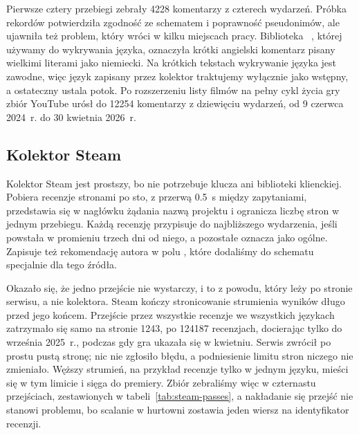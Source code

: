 Pierwsze cztery przebiegi zebrały \num{4228} komentarzy z czterech wydarzeń.
Próbka rekordów potwierdziła zgodność ze schematem i poprawność pseudonimów, ale ujawniła też problem, który wróci w kilku miejscach pracy.
Biblioteka ~\cite{langdetect}, której używamy do wykrywania języka, oznaczyła krótki angielski komentarz pisany wielkimi literami jako niemiecki.
Na krótkich tekstach wykrywanie języka jest zawodne, więc język zapisany przez kolektor traktujemy wyłącznie jako wstępny, a ostateczny ustala potok.
Po rozszerzeniu listy filmów na pełny cykl życia gry zbiór YouTube urósł do \num{12254} komentarzy z dziewięciu wydarzeń, od 9 czerwca 2024~r. do 30 kwietnia 2026~r.

\subsection{Kolektor Steam}
\label{sec:impl-steam}

Kolektor Steam jest prostszy, bo nie potrzebuje klucza ani biblioteki klienckiej.
Pobiera recenzje stronami po sto, z przerwą \qty{0.5}{\second} między zapytaniami, przedstawia się w nagłówku żądania nazwą projektu i ogranicza liczbę stron w jednym przebiegu.
Każdą recenzję przypisuje do najbliższego wydarzenia, jeśli powstała w promieniu trzech dni od niego, a pozostałe oznacza jako ogólne.
Zapisuje też rekomendację autora w polu , które dodaliśmy do schematu specjalnie dla tego źródła.

Okazało się, że jedno przejście nie wystarczy, i to z powodu, który leży po stronie serwisu, a nie kolektora.
Steam kończy stronicowanie strumienia wyników długo przed jego końcem.
Przejście przez wszystkie recenzje we wszystkich językach zatrzymało się samo na stronie \num{1243}, po \num{124187} recenzjach, docierając tylko do września 2025~r., podczas gdy gra ukazała się w kwietniu.
Serwis zwrócił po prostu pustą stronę; nic nie zgłosiło błędu, a podniesienie limitu stron niczego nie zmieniało.
Węższy strumień, na przykład recenzje tylko w jednym języku, mieści się w tym limicie i sięga do premiery.
Zbiór zebraliśmy więc w czternastu przejściach, zestawionych w tabeli~\ref{tab:steam-passes}, a nakładanie się przejść nie stanowi problemu, bo scalanie w hurtowni zostawia jeden wiersz na identyfikator recenzji.

